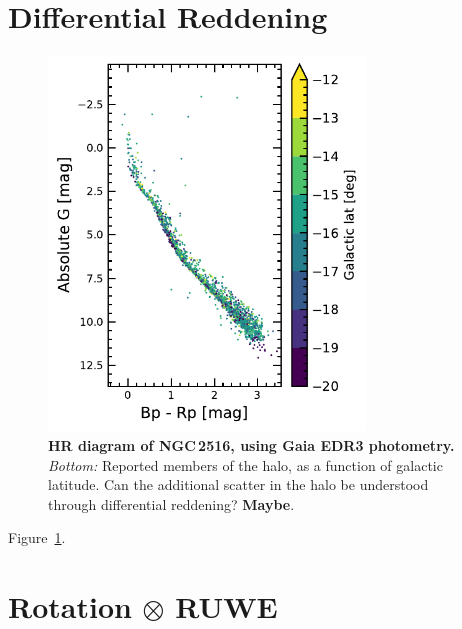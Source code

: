 \documentclass[12pt,twocolumn,tighten]{aastex63}
\begin{document}
\section{Differential Reddening}
\label{app:diffred}

\begin{figure}[t]
	\begin{center}
		\leavevmode
			\includegraphics[width=0.75\textwidth]{f2c.pdf}
	\end{center}
	\vspace{-0.7cm}
  \caption{ {\bf HR diagram of NGC\,2516, using Gaia EDR3 photometry.}
    {\it Bottom:} Reported members of the halo, as a function of
    galactic latitude. Can the additional scatter in the halo be
    understood through differential reddening?
    {\bf Maybe}.
    \label{fig:diffred}
  }
\end{figure}

Figure~\ref{fig:diffred}.


\section{Rotation $\otimes$ RUWE}
\label{app:ruwe}
\end{document}
